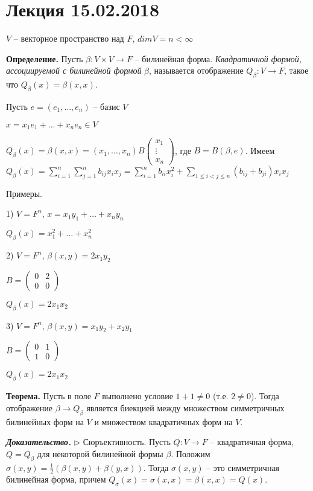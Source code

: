 \section{Лекция 15.02.2018}

$V$ -- векторное пространство над $F$, $dimV=n < \infty$

\bigskip
\textbf{Определение.} Пусть $\beta: V \times V \rightarrow F$ -- билинейная форма. \textit{Квадратичной формой, ассоциируемой с билинейной формой} $\beta$, называется отображение $Q_\beta : V \rightarrow F$, такое что $Q_\beta(x) = \beta(x, x)$.

\bigskip
Пусть $e = (e_1, \dots, e_n)$ -- базис $V$

$x = x_1 e_1 + \dots + x_n e_n \in V$

$Q_\beta(x) = \beta(x, x) = (x_1, \dots, x_n) B \begin{pmatrix} x_1 \\ \vdots \\ x_n \end {pmatrix}$, где $B = B(\beta, e)$. Имеем $Q_\beta(x) = \sum\limits_{i=1}^n \sum\limits_{j=1}^n b_{ij} x_i x_j = \sum\limits_{i=1}^n b_{ii} x_i^2 + \sum\limits_{1 \leq i < j \leq n} (b_{ij} + b_{ji}) x_i x_j$

\bigskip
Примеры.

1) $V = F^n$, $x = x_1 y_1 + \dots + x_n y_n$

$Q_\beta(x) = x_1^2 + \dots + x_n^2$

2) $V = F^n$, $\beta(x, y) = 2x_1 y_2$

$B = \begin{pmatrix} 0 & 2 \\ 0 & 0 \end{pmatrix}$

$Q_\beta (x) = 2x_1 x_2$

3) $V = F^n$, $\beta(x, y) = x_1 y_2 + x_2 y_1$

$B = \begin{pmatrix} 0 & 1 \\ 1 & 0 \end{pmatrix}$

$Q_\beta(x) = 2x_1 x_2$

\bigskip
\textbf{Теорема.} Пусть в поле $F$ выполнено условие $1+1 \neq 0$ (т.е. $2 \neq 0$). Тогда отображение $\beta \rightarrow Q_\beta$ является биекцией между множеством симметричных билинейных форм на $V$ и множеством квадратичных форм на $V$.

\bigskip
\textbf{\textit{Доказательство.}} $\rhd$ Сюръективность. Пусть $Q: V \rightarrow F$ -- квадратичная форма, $Q = Q_\beta$ для некоторой билинейной формы $\beta$. Положим $\sigma(x, y) = \frac{1}{2} (\beta(x,y) + \beta(y,x))$. Тогда $\sigma(x,y)$ -- это симметричная билинейная форма, причем $Q_\sigma (x) = \sigma(x, x) = \beta(x, x) = Q(x)$.

